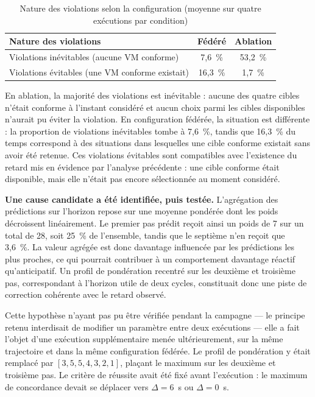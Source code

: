 \begin{table}[H]
    \centering
    \caption{Nature des violations selon la configuration (moyenne sur quatre exécutions par condition)}
    \label{tab:violations-evitables}
    \begin{tabular}{lcc}
        \toprule
        \textbf{Nature des violations} & \textbf{Fédéré} & \textbf{Ablation} \\
        \midrule
        Violations inévitables (aucune VM conforme) & 7,6~\% & 53,2~\% \\
        Violations évitables (une VM conforme existait) & 16,3~\% & 1,7~\% \\
        \bottomrule
    \end{tabular}
\end{table}

En ablation, la majorité des violations est inévitable : aucune des quatre cibles n'était conforme à l'instant considéré et aucun choix parmi les cibles disponibles n'aurait pu éviter la violation. En configuration fédérée, la situation est différente : la proportion de violations inévitables tombe à 7,6~\%, tandis que 16,3~\% du temps correspond à des situations dans lesquelles une cible conforme existait sans avoir été retenue. Ces violations évitables sont compatibles avec l'existence du retard mis en évidence par l'analyse précédente : une cible conforme était disponible, mais elle n'était pas encore sélectionnée au moment considéré.

\textbf{Une cause candidate a été identifiée, puis testée.} L'agrégation des prédictions sur l'horizon repose sur une moyenne pondérée dont les poids décroissent linéairement. Le premier pas prédit reçoit ainsi un poids de 7 sur un total de 28, soit 25~\% de l'ensemble, tandis que le septième n'en reçoit que 3,6~\%. La valeur agrégée est donc davantage influencée par les prédictions les plus proches, ce qui pourrait contribuer à un comportement davantage réactif qu'anticipatif. Un profil de pondération recentré sur les deuxième et troisième pas, correspondant à l'horizon utile de deux cycles, constituait donc une piste de correction cohérente avec le retard observé.

Cette hypothèse n'ayant pas pu être vérifiée pendant la campagne — le principe retenu interdisait de modifier un paramètre entre deux exécutions — elle a fait l'objet d'une exécution supplémentaire menée ultérieurement, sur la même trajectoire et dans la même configuration fédérée. Le profil de pondération y était remplacé par $[3,5,5,4,3,2,1]$, plaçant le maximum sur les deuxième et troisième pas. Le critère de réussite avait été fixé avant l'exécution : le maximum de concordance devait se déplacer vers $\Delta = 6$~s ou $\Delta = 0$~s.

